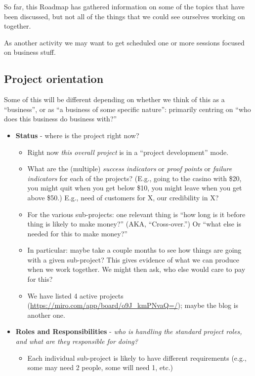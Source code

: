 \documentclass[11pt]{article}
\begin{document}
So far, this Roadmap has gathered information on some of the topics
that have been discussed, but not all of the things that we could see
ourselves working on together.

As another activity we may want to get scheduled one or more sessions
focused on business stuff.

\subsection{Project orientation}
\label{sec:orgeccdac0}

Some of this will be different depending on whether we think of this
as a “business”, or as “a business of some specific nature”: primarily
centring on “who does this business do business with?”

\begin{itemize}
\item \textbf{Status} - where is the project right now?
\begin{itemize}
\item Right now \emph{this overall project} is in a “project development” mode.
\item What are the (multiple) \emph{success indicators} or \emph{proof points} or \emph{failure indicators} for each of the projects? (E.g., going to the casino with \$20, you might quit when you get below \$10, you might leave when you get above \$50.) E.g., need of customers for X, our credibility in X?
\item For the various sub-projects: one relevant thing is “how long is it before thing is likely to make money?” (AKA, “Cross-over.”) Or “what else is needed for this to make money?”
\item In particular: maybe take a couple months to see how things are going with a given sub-project? This gives evidence of what we can produce when we work together. We might then ask, who else would care to pay for this?
\item We have listed 4 active projects (\url{https://miro.com/app/board/o9J\_kmPNvaQ=/}); maybe the blog is another one.
\end{itemize}
\item \textbf{Roles and Responsibilities} - \emph{who is handling the standard project roles, and what are they responsible for doing?}
\begin{itemize}
\item Each individual sub-project is likely to have different requirements (e.g., some may need 2 people, some will need 1, etc.)

\end{itemize}
\end{itemize}
\end{document}
